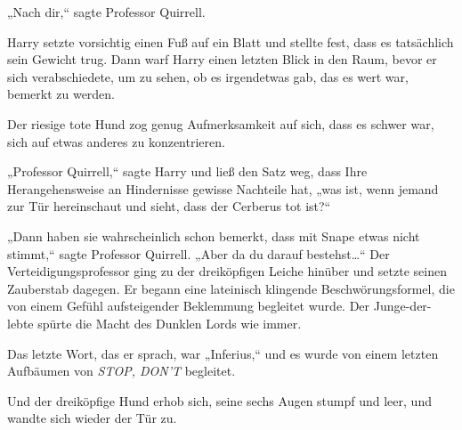 „Nach dir,“ sagte Professor Quirrell.

Harry setzte vorsichtig einen Fuß auf ein Blatt und stellte fest, dass es tatsächlich sein Gewicht trug. Dann warf Harry einen letzten Blick in den Raum, bevor er sich verabschiedete, um zu sehen, ob es irgendetwas gab, das es wert war, bemerkt zu werden.

Der riesige tote Hund zog genug Aufmerksamkeit auf sich, dass es schwer war, sich auf etwas anderes zu konzentrieren.

„Professor Quirrell,“ sagte Harry und ließ den Satz weg, dass Ihre Herangehensweise an Hindernisse gewisse Nachteile hat, „was ist, wenn jemand zur Tür hereinschaut und sieht, dass der Cerberus tot ist?“

„Dann haben sie wahrscheinlich schon bemerkt, dass mit Snape etwas nicht stimmt,“ sagte Professor Quirrell. „Aber da du darauf bestehst…“
Der Verteidigungsprofessor ging zu der dreiköpfigen Leiche hinüber und setzte seinen Zauberstab dagegen. Er begann eine lateinisch klingende Beschwörungsformel, die von einem Gefühl aufsteigender Beklemmung begleitet wurde. Der Junge-der-lebte spürte die Macht des Dunklen Lords wie immer.

Das letzte Wort, das er sprach, war „Inferius,“ und es wurde von einem letzten Aufbäumen von \emph{STOP, DON’T} begleitet.

Und der dreiköpfige Hund erhob sich, seine sechs Augen stumpf und leer, und wandte sich wieder der Tür zu.

